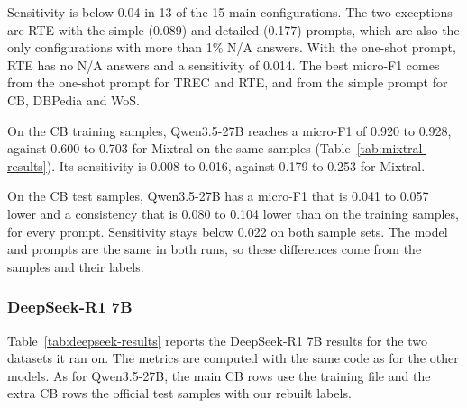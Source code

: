 Sensitivity is below 0.04 in 13 of the 15 main configurations. The two
exceptions are RTE with the simple (0.089) and detailed (0.177) prompts, which
are also the only configurations with more than 1\% N/A answers. With the
one-shot prompt, RTE has no N/A answers and a sensitivity of 0.014. The best
micro-F1 comes from the one-shot prompt for TREC and RTE, and from the simple
prompt for CB, DBPedia and WoS.

On the CB training samples, Qwen3.5-27B reaches a micro-F1 of 0.920 to 0.928,
against 0.600 to 0.703 for Mixtral on the same samples
(Table~\ref{tab:mixtral-results}). Its sensitivity is 0.008 to 0.016, against
0.179 to 0.253 for Mixtral.

On the CB test samples, Qwen3.5-27B has a micro-F1 that is 0.041 to 0.057
lower and a consistency that is 0.080 to 0.104 lower than on the training
samples, for every prompt. Sensitivity stays below 0.022 on both sample sets.
The model and prompts are the same in both runs, so these differences come
from the samples and their labels.

\subsubsection{DeepSeek-R1 7B}
\label{sec:results-deepseek}

Table~\ref{tab:deepseek-results} reports the DeepSeek-R1 7B results for the
two datasets it ran on. The metrics are computed with the same code as for the
other models. As for Qwen3.5-27B, the main CB rows use the training file and
the extra CB rows the official test samples with our rebuilt labels.

